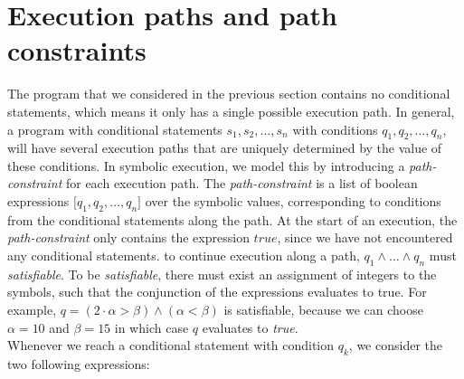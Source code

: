 \section{Execution paths and path constraints}
		The program that we considered in the previous section contains no conditional statements, which means it only has a single possible execution path. In general, a program with conditional statements $s_1, s_2, \ldots, s_n$ with conditions $q_1, q_2, \ldots, q_n$, will have several execution paths that are uniquely determined by the value of these conditions. In symbolic execution, we model this by introducing a \emph{path-constraint} for each execution path. The \emph{path-constraint} is a list of boolean expressions $\lbrack q_1, q_2, \ldots, q_n \rbrack$ over the symbolic values, corresponding to conditions from the conditional statements along the path. At the start of an execution, the \emph{path-constraint} only contains the expression $true$, since we have not encountered any conditional statements. to continue execution along a path, $q_1 \land \ldots \land q_n$ must \emph{satisfiable}. To be \emph{satisfiable}, there must exist an assignment of integers to the symbols, such that the conjunction of the expressions evaluates to true. For example, $q = (2\cdot \alpha > \beta) \land (\alpha < \beta)$ is satisfiable, because we can choose $\alpha = 10$ and $\beta = 15$ in which case $q$ evaluates to \emph{true}.
		\\ 
		Whenever we reach a conditional statement with condition $q_k$, we consider the two following expressions:
		


